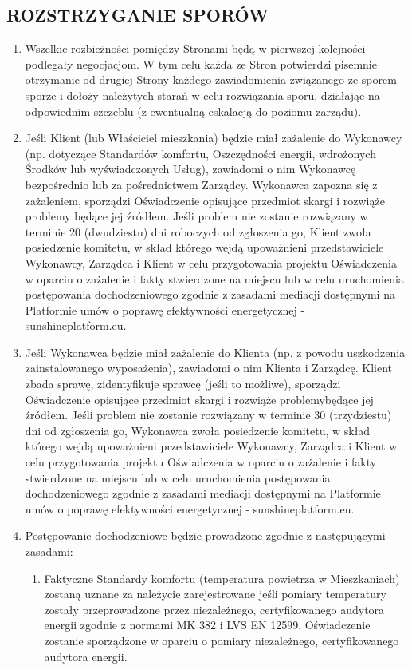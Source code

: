 \begin{multicols}{2}
\subsection{ROZSTRZYGANIE SPORÓW}
\begin{enumerate}
	\item Wszelkie rozbieżności pomiędzy Stronami będą w pierwszej kolejności podlegały negocjacjom. W tym celu każda ze Stron potwierdzi pisemnie otrzymanie od drugiej Strony każdego zawiadomienia związanego ze sporem sporze i dołoży należytych starań w celu rozwiązania sporu, działając na odpowiednim szczeblu (z ewentualną eskalacją do poziomu zarządu).
	\item Jeśli Klient (lub Właściciel mieszkania) będzie miał zażalenie do Wykonawcy (np. dotyczące Standardów komfortu, Oszczędności energii, wdrożonych Środków lub wyświadczonych Usług), zawiadomi o nim Wykonawcę bezpośrednio lub za pośrednictwem Zarządcy. Wykonawca zapozna się z zażaleniem, sporządzi Oświadczenie opisujące przedmiot skargi i rozwiąże problemy będące jej źródłem. Jeśli problem nie zostanie rozwiązany w terminie 20 (dwudziestu) dni roboczych od zgłoszenia go, Klient zwoła posiedzenie komitetu, w skład którego wejdą upoważnieni przedstawiciele Wykonawcy, Zarządca i Klient w celu przygotowania projektu Oświadczenia w oparciu o zażalenie i fakty stwierdzone na miejscu lub w celu uruchomienia postępowania dochodzeniowego zgodnie z zasadami mediacji dostępnymi na Platformie umów o poprawę efektywności energetycznej - sunshineplatform.eu.
	\item Jeśli Wykonawca będzie miał zażalenie do Klienta (np. z powodu uszkodzenia zainstalowanego wyposażenia), zawiadomi o nim Klienta i Zarządcę. Klient zbada sprawę, zidentyfikuje sprawcę (jeśli to możliwe), sporządzi Oświadczenie opisujące przedmiot skargi i rozwiąże problemybędące jej źródłem. Jeśli problem nie zostanie rozwiązany w terminie 30 (trzydziestu) dni od zgłoszenia go, Wykonawca zwoła posiedzenie komitetu, w skład którego wejdą upoważnieni przedstawiciele Wykonawcy, Zarządca i Klient w celu przygotowania projektu Oświadczenia w oparciu o zażalenie i fakty stwierdzone na miejscu lub w celu uruchomienia postępowania dochodzeniowego zgodnie z zasadami mediacji dostępnymi na Platformie umów o poprawę efektywności energetycznej - sunshineplatform.eu.
	\item Postępowanie dochodzeniowe będzie prowadzone zgodnie z następującymi zasadami:
	\begin{enumerate}
		\item Faktyczne Standardy komfortu (temperatura powietrza w Mieszkaniach) zostaną uznane za należycie zarejestrowane jeśli pomiary temperatury zostały przeprowadzone przez niezależnego, certyfikowanego audytora energii zgodnie z normami MK 382 i LVS EN 12599. Oświadczenie zostanie sporządzone w oparciu o pomiary niezależnego, certyfikowanego audytora energii.

\end{enumerate}
\end{enumerate}
\end{multicols}
